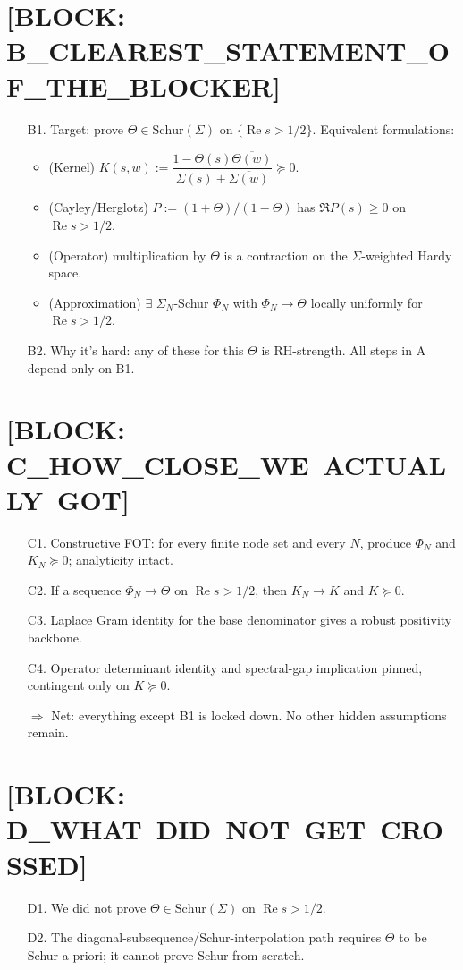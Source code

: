 \documentclass[11pt]{article}
\newcommand{\ReS}{\operatorname{Re}}
\newcommand{\Si}{\Sigma}
\newcommand{\SiN}{\Sigma_N}
\newcommand{\Th}{\Theta}
\newcommand{\Hhp}{\{\ReS s>1/2\}}
\begin{document}
\section*{[BLOCK: B\_CLEAREST\_STATEMENT\_OF\_THE\_BLOCKER]}
\begin{itemize}
  \item[B1.] Target: prove $\Th\in\mathrm{Schur}(\Si)$ on $\Hhp$.
  Equivalent formulations:
  \begin{itemize}
    \item (Kernel) $K(s,w):=\dfrac{1-\Th(s)\overline{\Th(w)}}{\Si(s)+\overline{\Si(w)}}\succeq 0$.
    \item (Cayley/Herglotz) $P:=(1+\Th)/(1-\Th)$ has $\Re P(s)\ge 0$ on $\ReS s>1/2$.
    \item (Operator) multiplication by $\Th$ is a contraction on the $\Si$-weighted Hardy space.
    \item (Approximation) $\exists$ $\SiN$-Schur $\Phi_N$ with $\Phi_N\to\Th$ locally uniformly for $\ReS s>1/2$.
  \end{itemize}
  \item[B2.] Why it’s hard: any of these for this $\Th$ is RH-strength. All steps in A depend only on B1.
\end{itemize}

\section*{[BLOCK: C\_HOW\_CLOSE\_WE\ ACTUALLY\ GOT]}
\begin{itemize}
  \item[C1.] Constructive FOT: for every finite node set and every $N$, produce $\Phi_N$ and $K_N\succeq0$; analyticity intact.
  \item[C2.] If a sequence $\Phi_N\to\Th$ on $\ReS s>1/2$, then $K_N\to K$ and $K\succeq0$.
  \item[C3.] Laplace Gram identity for the base denominator gives a robust positivity backbone.
  \item[C4.] Operator determinant identity and spectral-gap implication pinned, contingent only on $K\succeq0$.
  
  \noindent$\Rightarrow$ Net: everything except B1 is locked down. No other hidden assumptions remain.
\end{itemize}

\section*{[BLOCK: D\_WHAT\ DID\ NOT\ GET\ CROSSED]}
\begin{itemize}
  \item[D1.] We did not prove $\Th\in\mathrm{Schur}(\Si)$ on $\ReS s>1/2$.
  \item[D2.] The diagonal-subsequence/Schur-interpolation path requires $\Th$ to be Schur a priori; it cannot prove Schur from scratch.
\end{itemize}
\end{document}
